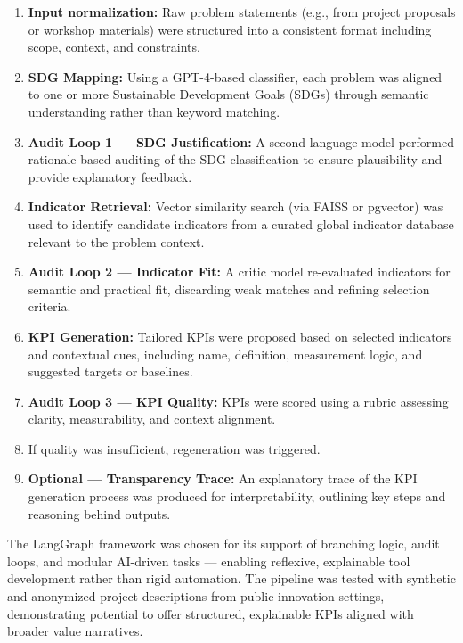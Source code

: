 \begin{enumerate}
    \item \textbf{Input normalization:} Raw problem statements (e.g., from project proposals or workshop materials) were structured into a consistent format including scope, context, and constraints.
    \item \textbf{SDG Mapping:} Using a GPT-4-based classifier, each problem was aligned to one or more Sustainable Development Goals (SDGs) through semantic understanding rather than keyword matching.
    \item \textbf{Audit Loop 1 — SDG Justification:} A second language model performed rationale-based auditing of the SDG classification to ensure plausibility and provide explanatory feedback.
    \item \textbf{Indicator Retrieval:} Vector similarity search (via FAISS or pgvector) was used to identify candidate indicators from a curated global indicator database relevant to the problem context.
    \item \textbf{Audit Loop 2 — Indicator Fit:} A critic model re-evaluated indicators for semantic and practical fit, discarding weak matches and refining selection criteria.
    \item \textbf{KPI Generation:} Tailored KPIs were proposed based on selected indicators and contextual cues, including name, definition, measurement logic, and suggested targets or baselines.
    \item \textbf{Audit Loop 3 — KPI Quality:} KPIs were scored using a rubric assessing clarity, measurability, and context alignment.
    \item If quality was insufficient, regeneration was triggered.
    \item \textbf{Optional — Transparency Trace:} An explanatory trace of the KPI generation process was produced for interpretability, outlining key steps and reasoning behind outputs.
\end{enumerate}

The LangGraph framework was chosen for its support of branching logic, audit loops, and modular AI-driven tasks — enabling reflexive, explainable tool development rather than rigid automation.
The pipeline was tested with synthetic and anonymized project descriptions from public innovation settings, demonstrating potential to offer structured, explainable KPIs aligned with broader value narratives.


